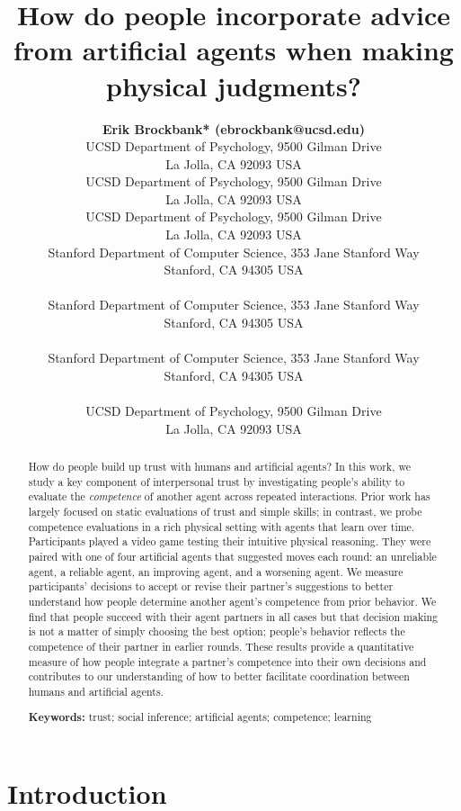 \documentclass[10pt,letterpaper]{article}
\title{How do people incorporate advice from artificial agents when making physical judgments?}
\author{
  {
  \large \bf Erik Brockbank* (ebrockbank@ucsd.edu)} \\
  UCSD Department of Psychology, 9500 Gilman Drive \\
  La Jolla, CA 92093 USA
  \AND {\large \bf Haoliang Wang* (haw027@ucsd.edu)} \\
  UCSD Department of Psychology, 9500 Gilman Drive \\
  La Jolla, CA 92093 USA
  \AND {\large \bf Justin Yang (juy003@ucsd.edu)} \\
  UCSD Department of Psychology, 9500 Gilman Drive \\
  La Jolla, CA 92093 USA
  \AND {\large \bf Suvir Mirchandani (suvir@cs.stanford.edu)} \\
  Stanford Department of Computer Science, 353 Jane Stanford Way \\
  Stanford, CA 94305 USA \\
  \AND {\large \bf Erdem Biyik (ebiyik@stanford.edu)} \\
  Stanford Department of Computer Science, 353 Jane Stanford Way \\
  Stanford, CA 94305 USA \\
  \AND {\large \bf Dorsa Sadigh (dorsa@cs.stanford.edu)} \\
  Stanford Department of Computer Science, 353 Jane Stanford Way \\
  Stanford, CA 94305 USA \\
  \AND {\large \bf Judith Fan (jefan@ucsd.edu)} \\
  UCSD Department of Psychology, 9500 Gilman Drive \\
  La Jolla, CA 92093 USA \\
}
\begin{document}
\maketitle


\begin{abstract}
How do people build up trust with humans and artificial agents? In this work, we study a key component of interpersonal trust by investigating people's ability to evaluate the \textit{competence} of another agent across repeated interactions. Prior work has largely focused on static evaluations of trust and simple skills; in contrast, we probe competence evaluations in a rich physical setting with agents that learn over time. Participants played a video game testing their intuitive physical reasoning. They were paired with one of four artificial agents that suggested moves each round: an unreliable agent, a reliable agent, an improving agent, and a worsening agent. We measure participants' decisions to accept or revise their partner's suggestions to better understand how people determine another agent's competence from prior behavior. We find that people succeed with their agent partners in all cases but that decision making is not a matter of simply choosing the best option; people's behavior reflects the competence of their partner in earlier rounds. These results provide a quantitative measure of how people integrate a partner's competence into their own decisions and contributes to our understanding of how to better facilitate coordination between humans and artificial agents.

\textbf{Keywords:} 
trust; social inference; artificial agents; competence; learning 
\end{abstract}


\section{Introduction}
\end{document}
